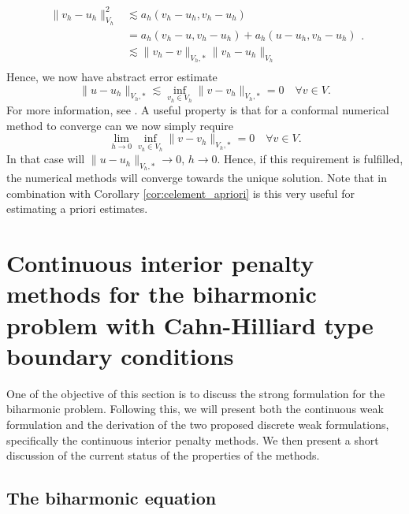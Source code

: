 \documentclass[11pt]{article}
\theoremstyle{remark}
\numberwithin{equation}{section}
\begin{document}
\begin{equation}
\label{eq:cealemma_proof}
    \begin{split}
 \| v_{h} -u_{h} \|_{ V_{h}  }^{ 2 } & \lesssim   a_{h}( v_{h} - u_{h}, v_{h} - u_{h} )    \\
 &= a_{h}( v_{h} - u, v_{h}- u_{h}) + a_{h}( u - u_{h}, v_{h} - u_{h})   \\
 & \lesssim \| v_{h}- v \|_{ V_{h},* }^{  } \| v_{h}- u_{h} \|_{V_{h} }^{  }   \\
    \end{split}
.\end{equation}
Hence, we now have abstract error estimate
\begin{equation}
\| u - u_{h} \|_{ V_{h},*  }^{  }  \lesssim  \inf_{v_{h} \in  V_{h}}  \| v - v_{h} \|_{ V_{h},*  }^{  } = 0 \quad  \forall v \in V.
\end{equation}
For more information, see \cite[Theorem 1.35]{pietro2012}.
A useful property is that for a conformal numerical method to converge can we now simply require
\begin{equation}
\lim_{h \to 0}  \inf_{v_{h} \in  V_{h}}  \| v - v_{h} \|_{ V_{h},*  }^{  } = 0 \quad  \forall v \in V.
\end{equation}
In that case will $\| u - u_{h} \|_{ V_{h},*  }^{  }  \to  0$, $h \to  0$. Hence, if this requirement is fulfilled, the numerical methods will converge towards the unique solution.
Note that in combination with Corollary \ref{cor:celement_apriori} is this very useful for estimating a priori estimates.


\section{Continuous interior penalty methods for the biharmonic problem with Cahn-Hilliard type boundary conditions}%
\label{sec:CIP_biharmonic_problem}

One of the objective of this section is to discuss the strong formulation for the biharmonic problem.
Following this, we will present both the continuous weak formulation and the derivation of the two proposed discrete weak formulations, specifically the continuous interior penalty methods.
We then present a short discussion of the current status of the properties of the methods.

\subsection{The biharmonic equation}
\label{sub:the_biharmonic_problem_with_c_h_boundary_conditions}
\end{document}
